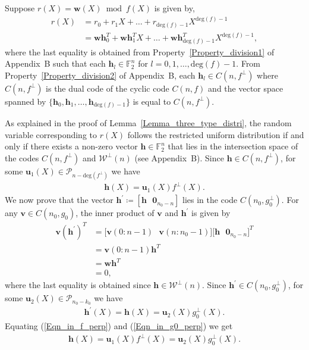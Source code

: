 \documentclass[10pt,journal]{IEEEtran}
\def \deg{{\mathrm{deg}}}
\begin{document}
Suppose $r(X) = \mathbf{w}(X) \bmod f(X)$ is given by,
% 
\begin{equation}
%  
\begin{aligned}
%  
r(X) &= r_0 +r_1X + \ldots + r_{{\deg(f)}-1}X^{{\deg(f)}-1} \\ 
	      &= \mathbf{w}\mathbf{h}_0^T +\mathbf{w}\mathbf{h}_1^T X + \ldots + \mathbf{w}\mathbf{h}_{{\deg(f)}-1}^TX^{{\deg(f)}-1},
\label{Eqn_r_w_mod_f_proof}
% 
\end{aligned}
% 
\end{equation}
% 
where the last equality is obtained from Property~\ref{Property_division1} of Appendix~B such that each $\mathbf{h}_l \in \mathbb{F}_2^n$
for $l = 0,1,\ldots,\deg(f)-1$.
From Property~\ref{Property_division2} of Appendix~B, each $\mathbf{h}_l \in C(n,f^{\perp})$
where $C(n,f^{\perp})$ is the dual code of the cyclic code $C(n,f)$
and the vector space spanned by $\{ \mathbf{h}_0, \mathbf{h}_1, \ldots, \mathbf{h}_{\deg(f)-1} \}$ is equal to $C(n,f^{\perp})$.

As explained in the proof of Lemma~\ref{Lemma_three_type_distri}, the random variable corresponding to 
$r(X)$ follows the restricted uniform distribution if and only if 
there exists a non-zero vector $\mathbf{h} \in \mathbb{F}_2^n$ that lies in the intersection
space of the codes $C(n,f^{\perp})$ and $\mathcal{W}^{\perp}(n)$ (see Appendix~B).
Since $\mathbf{h} \in C(n,f^{\perp})$, for some $\mathbf{u}_1(X) \in \mathcal{P}_{n-\deg(f^{\perp})}$ we have
% 
\begin{align}
%  
\mathbf{h}(X) = \mathbf{u}_1(X) f^{\perp}(X).
\label{Eqn_in_f_perp}
% 
\end{align}
% 
We now prove that the vector $\mathbf{h}^{\prime} \coloneqq [\mathbf{h} \mbox{~~} \mathbf{0}_{n_0-n}]$ lies in the code $C(n_0, g_0^{\perp})$.
For any $\mathbf{v} \in C(n_0,g_0)$, the inner product of $\mathbf{v}$ and $\mathbf{h}^{\prime}$ is given by
\begin{equation}
% 
\begin{aligned}
%  
\mathbf{v} (\mathbf{h}^{\prime})^T &= \Big[\mathbf{v}(0:n-1) \mbox{~~}\mathbf{v}(n:n_0-1)\Big] \Big[\mathbf{h} \mbox{~~} \mathbf{0}_{n_0-n}\Big]^T \\
				   &= \mathbf{v}(0:n-1) \mathbf{h}^T \\
				   &= \mathbf{w} \mathbf{h}^T  \\
				   &= 0, 
% 
\end{aligned}
% 
\label{Equation_W_perp_in_Cn0g0_perp}
% 
\end{equation}
% 
where the last equality is obtained since $\mathbf{h} \in \mathcal{W}^{\perp}(n)$.
Since $\mathbf{h}^{\prime} \in C(n_0,g_0^{\perp})$, for some $\mathbf{u}_2(X) \in \mathcal{P}_{n_0-k_0}$ we have
% 
\begin{align}
%  
\mathbf{h}^{\prime}(X)= \mathbf{h}(X) = \mathbf{u}_2(X) g_0^{\perp}(X).
\label{Eqn_in_g0_perp}
% 
\end{align}
% 
Equating (\ref{Eqn_in_f_perp}) and (\ref{Eqn_in_g0_perp}) we get
% 
\begin{align}
%  
\mathbf{h}(X) = \mathbf{u}_1(X) f^{\perp}(X) = \mathbf{u}_2(X) g_0^{\perp}(X).
\label{Eqn_degree_inequality}
% 
\end{align}
% 
\end{document}
